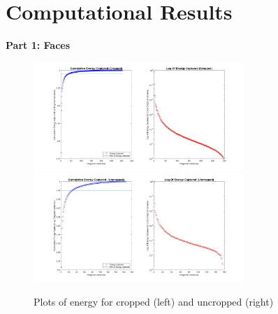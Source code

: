 \documentclass{article}
\begin{document}
\section*{\fontsize{19}{15}\selectfont Computational Results}
	\textbf{Part 1: Faces} \\
\begin{figure}[H]
\begin{center}
\includegraphics[width = 8cm]{var1}
\includegraphics[width = 8cm]{var2}
\caption{ Plots of energy for cropped (left) and uncropped (right)}
\end{center}
\end{figure}
\end{document}
